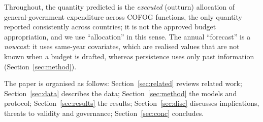 Throughout, the quantity predicted is the \emph{executed} (outturn) allocation of general-government expenditure across COFOG functions, the only quantity reported consistently across countries; it is not the approved budget appropriation, and we use ``allocation'' in this sense. The annual ``forecast'' is a \emph{nowcast}: it uses same-year covariates, which are realised values that are not known when a budget is drafted, whereas persistence uses only past information (Section~\ref{sec:method}).

The paper is organised as follows: Section~\ref{sec:related} reviews related work; Section~\ref{sec:data} describes the data; Section~\ref{sec:method} the models and protocol; Section~\ref{sec:results} the results; Section~\ref{sec:disc} discusses implications, threats to validity and governance; Section~\ref{sec:conc} concludes.
